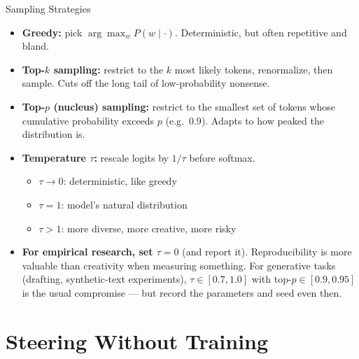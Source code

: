 \begin{frame}{Sampling Strategies}
\begin{itemize}
\item \textbf{Greedy:} pick $\arg\max_w P(w \mid \cdot)$. Deterministic, but often repetitive and bland.

\medskip
\item \textbf{Top-$k$ sampling:} restrict to the $k$ most likely tokens, renormalize, then sample. Cuts off the long tail of low-probability nonsense.

\medskip
\item \textbf{Top-$p$ (nucleus) sampling:} restrict to the smallest set of tokens whose cumulative probability exceeds $p$ (e.g.\ $0.9$). Adapts to how peaked the distribution is.

\medskip
\item \textbf{Temperature $\tau$:} rescale logits by $1/\tau$ before softmax.
\begin{itemize}
    \item $\tau \rightarrow 0$: deterministic, like greedy
    \item $\tau = 1$: model's natural distribution
    \item $\tau > 1$: more diverse, more creative, more risky
\end{itemize}

\medskip
\item \textbf{For empirical research, set $\tau = 0$} (and report it). Reproducibility is more valuable than creativity when measuring something. For generative tasks (drafting, synthetic-text experiments), $\tau \in [0.7, 1.0]$ with top-$p \in [0.9, 0.95]$ is the usual compromise --- but record the parameters and seed even then.
\end{itemize}
\end{frame}

\section{Steering Without Training}

